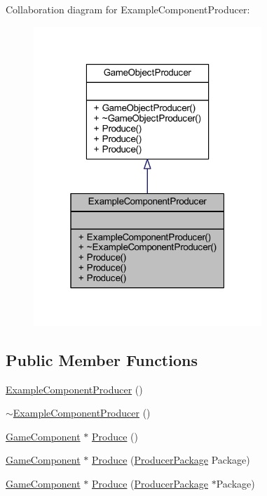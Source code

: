 Collaboration diagram for Example\-Component\-Producer\-:\nopagebreak
\begin{figure}[H]
\begin{center}
\leavevmode
\includegraphics[width=244pt]{class_example_component_producer__coll__graph}
\end{center}
\end{figure}
\subsection*{Public Member Functions}
\begin{DoxyCompactItemize}
\item 
\hyperlink{class_example_component_producer_ad4eeb56b75cbf68545d82619aa8e0184}{Example\-Component\-Producer} ()
\item 
\hyperlink{class_example_component_producer_a2c090cf13157589dfcd4fd9441d4d4f3}{$\sim$\-Example\-Component\-Producer} ()
\item 
\hyperlink{class_game_component}{Game\-Component} $\ast$ \hyperlink{class_example_component_producer_a63aba60e4b967000da407340505838de}{Produce} ()
\item 
\hyperlink{class_game_component}{Game\-Component} $\ast$ \hyperlink{class_example_component_producer_aeb985b69039c1db83c5826c01f31f53c}{Produce} (\hyperlink{class_producer_package}{Producer\-Package} Package)
\item 
\hyperlink{class_game_component}{Game\-Component} $\ast$ \hyperlink{class_example_component_producer_a177b5d9088f69aed43d10c9b2b8f2c01}{Produce} (\hyperlink{class_producer_package}{Producer\-Package} $\ast$Package)
\end{DoxyCompactItemize}


